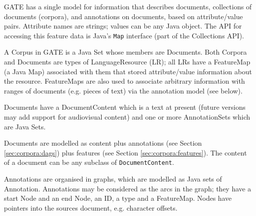 GATE has a single model for information that describes documents, collections
of documents (corpora), and annotations on documents, based on attribute/value
pairs. Attribute names are strings; values can be any Java object. The API
for accessing this feature data is Java's {\tt Map} interface (part of the
Collections API).



A Corpus in GATE is a Java Set whose members are Documents.
Both Corpora and Documents are types of LanguageResource (LR); all
LRs have a FeatureMap (a Java Map) associated with them that
stored attribute/value information about the resource. FeatureMaps are also
used to associate arbitrary information with ranges of documents (e.g. pieces
of text) via the annotation model (see below).

Documents have a DocumentContent which is
a text at present (future versions may add support for audiovisual content)
and one or more AnnotationSets which are Java Sets.



Documents are modelled as content plus annotations (see Section
\ref{sec:corpora:dags}) plus features (see Section \ref{sec:corpora:features}).
The content of a document can be any subclass of {\tt DocumentContent}.



Annotations are organised in graphs, which are modelled as Java sets of 
Annotation.  Annotations may be considered as the arcs in the graph; 
they have a start Node and an end Node, an ID, a type and a
FeatureMap. Nodes have pointers into the sources document, e.g. character
offsets.



